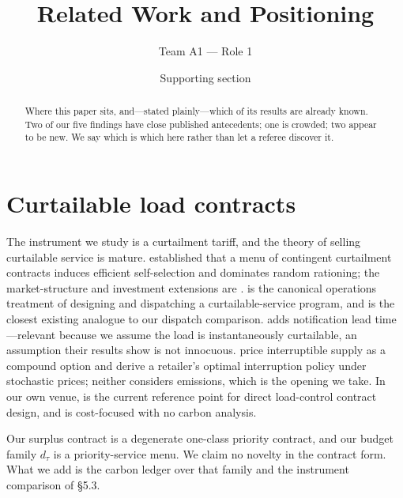 \documentclass[11pt,reqno]{amsart}
\begin{document}
\title[Related work and positioning]{Related Work and Positioning}
\author{Team A1 --- Role 1}
\date{Supporting section}
\begin{abstract}
Where this paper sits, and---stated plainly---which of its results are already known. Two
of our five findings have close published antecedents; one is crowded; two appear to be
new. We say which is which here rather than let a referee discover it.
\end{abstract}
\maketitle

\section{Curtailable load contracts}
The instrument we study is a curtailment tariff, and the theory of selling curtailable
service is mature. \citet{ChaoWilson1987} established that a menu of contingent curtailment
contracts induces efficient self-selection and dominates random rationing; the market-structure
and investment extensions are \citet{ChaoOrenSmithWilson1988}. \citet{OrenSmith1992} is the
canonical operations treatment of designing and dispatching a curtailable-service program,
and is the closest existing analogue to our dispatch comparison. \citet{StraussOren1993} adds
notification lead time---relevant because we assume the load is instantaneously curtailable,
an assumption their results show is not innocuous. \citet{KamatOren2002} price interruptible
supply as a compound option and \citet{BaldickKolosTompaidis2006} derive a retailer's optimal
interruption policy under stochastic prices; neither considers emissions, which is the
opening we take. In our own venue, \citet{FattahiDasuAhmadi2023} is the current reference
point for direct load-control contract design, and is cost-focused with no carbon analysis.

Our surplus contract is a degenerate one-class priority contract, and our budget family
$d_\tau$ is a priority-service menu. We claim no novelty in the contract form. What we add
is the carbon ledger over that family and the instrument comparison of \S5.3.
\end{document}
